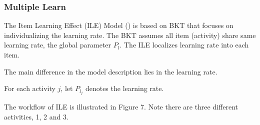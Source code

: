 \documentclass{article}
\begin{document}
\begin{center}
\end{center}

\subsubsection{Multiple Learn}

The Item Learning Effect (ILE) Model (\cite{multilearn}) is based on BKT that focuses on individualizing the learning rate. The BKT assumes all item (activity) share same learning rate, the global parameter \( P_l \). The ILE localizes learning rate into each item.

The main difference in the model description lies in the learning rate.

For each activity \( j \), let \( P_{l_j} \) denotes the learning rate.

The workflow of ILE is illustrated in Figure 7. Note there are three different activities, 1, 2 and 3.
\end{document}
